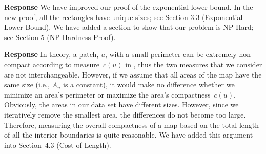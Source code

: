 \documentclass[a4paper,twoside,11pt]{reviewresponse}
\begin{document}
\textbf{Response}
We have improved our proof of the exponential lower bound.
In the new proof, all the rectangles have unique sizes;
see Section 3.3 (Exponential Lower Bound).
We have added a section to show that our problem is NP-Hard;
see Section 5 (NP-Hardness Proof).




\textbf{Response}
In theory, a patch, $u$, with a small perimeter can be extremely non-compact according to measure~$c(u)$ in , thus the two measures that we consider are not interchangeable. However, if we assume that all areas of the map have the same size (i.e., $A_u$ is a constant), it would make no difference whether we minimize an area's perimeter or maximize the area's compactness~$c(u)$. Obviously, the areas in our data set have different sizes. However, since we iteratively remove the smallest area, the differences do not become too large. Therefore, measuring the overall compactness of a map based on the total length of all the interior boundaries is quite reasonable.
We have added this argument into Section~4.3 (Cost of Length).

%



\end{document}
